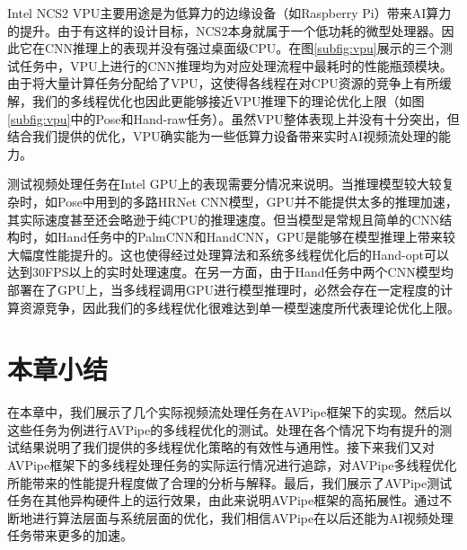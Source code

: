 Intel NCS2 VPU主要用途是为低算力的边缘设备（如Raspberry Pi）带来AI算力的提升。由于有这样的设计目标，NCS2本身就属于一个低功耗的微型处理器。因此它在CNN推理上的表现并没有强过桌面级CPU。在图\ref{subfig:vpu}展示的三个测试任务中，VPU上进行的CNN推理均为对应处理流程中最耗时的性能瓶颈模块。由于将大量计算任务分配给了VPU，这使得各线程在对CPU资源的竞争上有所缓解，我们的多线程优化也因此更能够接近VPU推理下的理论优化上限（如图\ref{subfig:vpu}中的Pose和Hand-raw任务）。虽然VPU整体表现上并没有十分突出，但结合我们提供的优化，VPU确实能为一些低算力设备带来实时AI视频流处理的能力。\par
测试视频处理任务在Intel GPU上的表现需要分情况来说明。当推理模型较大较复杂时，如Pose中用到的多路HRNet CNN模型，GPU并不能提供太多的推理加速，其实际速度甚至还会略逊于纯CPU的推理速度。但当模型是常规且简单的CNN结构时，如Hand任务中的PalmCNN和HandCNN，GPU是能够在模型推理上带来较大幅度性能提升的。这也使得经过处理算法和系统多线程优化后的Hand-opt可以达到30FPS以上的实时处理速度。在另一方面，由于Hand任务中两个CNN模型均部署在了GPU上，当多线程调用GPU进行模型推理时，必然会存在一定程度的计算资源竞争，因此我们的多线程优化很难达到单一模型速度所代表理论优化上限。

\section{本章小结}
在本章中，我们展示了几个实际视频流处理任务在AVPipe框架下的实现。然后以这些任务为例进行AVPipe的多线程优化的测试。处理在各个情况下均有提升的测试结果说明了我们提供的多线程优化策略的有效性与通用性。接下来我们又对AVPipe框架下的多线程处理任务的实际运行情况进行追踪，对AVPipe多线程优化所能带来的性能提升程度做了合理的分析与解释。最后，我们展示了AVPipe测试任务在其他异构硬件上的运行效果，由此来说明AVPipe框架的高拓展性。通过不断地进行算法层面与系统层面的优化，我们相信AVPipe在以后还能为AI视频处理任务带来更多的加速。